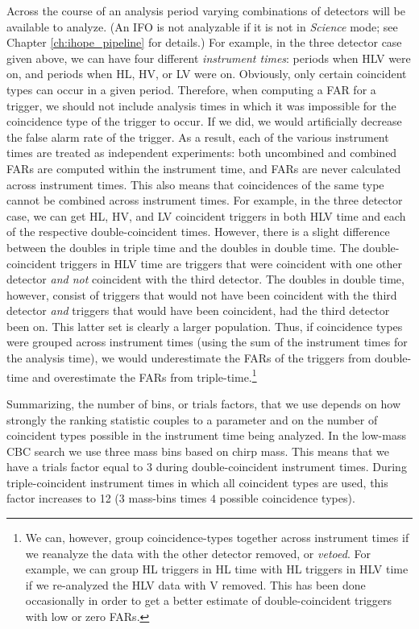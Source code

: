 Across the course of an analysis period varying combinations of detectors will be available to analyze. (An \ac{IFO} is not analyzable if it is not in \emph{Science} mode; see Chapter \ref{ch:ihope_pipeline} for details.) For example, in the three detector case given above, we can have four different \emph{instrument times}: periods when HLV were on, and periods when HL, HV, or LV were on. Obviously, only certain coincident types can occur in a given period. Therefore, when computing a \ac{FAR} for a trigger, we should not include analysis times in which it was impossible for the coincidence type of the trigger to occur. If we did, we would artificially decrease the false alarm rate of the trigger. As a result, each of the various instrument times are treated as independent experiments: both uncombined and combined \acp{FAR} are computed within the instrument time, and \acp{FAR} are never calculated across instrument times. This also means that coincidences of the same type cannot be combined across instrument times. For example, in the three detector case, we can get HL, HV, and LV coincident triggers in both HLV time and each of the respective double-coincident times. However, there is a slight difference between the doubles in triple time and the doubles in double time. The double-coincident triggers in HLV time are triggers that were coincident with one other detector \emph{and not} coincident with the third detector. The doubles in double time, however, consist of triggers that would not have been coincident with the third detector \emph{and} triggers that would have been coincident, had the third detector been on. This latter set is clearly a larger population. Thus, if coincidence types were grouped across instrument times (using the sum of the instrument times for the analysis time), we would underestimate the \acp{FAR} of the triggers from double-time and overestimate the \acp{FAR} from triple-time.\footnote{We can, however, group coincidence-types together across instrument times if we reanalyze the data with the other detector removed, or \emph{vetoed}. For example, we can group HL triggers in HL time with HL triggers in HLV time if we re-analyzed the HLV data with V removed. This has been done occasionally in order to get a better estimate of double-coincident triggers with low or zero \acp{FAR}.} 

Summarizing, the number of bins, or trials factors, that we use depends on how strongly the ranking statistic couples to a parameter and on the number of coincident types possible in the instrument time being analyzed. In the low-mass \ac{CBC} search we use three mass bins based on chirp mass. This means that we have a trials factor equal to $3$ during double-coincident instrument times. During triple-coincident instrument times in which all coincident types are used, this factor increases to 12 ($3$ mass-bins times $4$ possible coincidence types).

